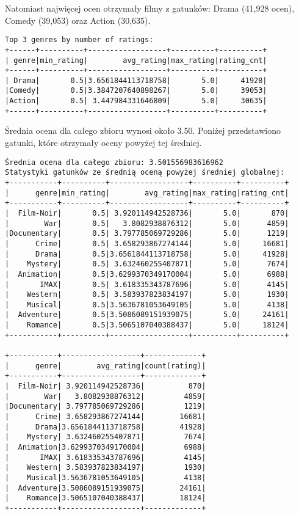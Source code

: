 \documentclass{article}
\begin{document}
Natomiast najwięcej ocen otrzymały filmy z gatunków: Drama (41,928 ocen), Comedy (39,053) oraz Action (30,635).

\begin{verbatim}
Top 3 genres by number of ratings:
+------+----------+------------------+----------+----------+
| genre|min_rating|        avg_rating|max_rating|rating_cnt|
+------+----------+------------------+----------+----------+
| Drama|       0.5|3.6561844113718758|       5.0|     41928|
|Comedy|       0.5|3.3847207640898267|       5.0|     39053|
|Action|       0.5| 3.447984331646809|       5.0|     30635|
+------+----------+------------------+----------+----------+
\end{verbatim}

Średnia ocena dla całego zbioru wynosi około 3.50. Poniżej przedstawiono gatunki, które otrzymały oceny powyżej tej średniej.

\begin{verbatim}
Średnia ocena dla całego zbioru: 3.501556983616962
Statystyki gatunków ze średnią oceną powyżej średniej globalnej:
+-----------+----------+------------------+----------+----------+
|      genre|min_rating|        avg_rating|max_rating|rating_cnt|
+-----------+----------+------------------+----------+----------+
|  Film-Noir|       0.5| 3.920114942528736|       5.0|       870|
|        War|       0.5|   3.8082938876312|       5.0|      4859|
|Documentary|       0.5| 3.797785069729286|       5.0|      1219|
|      Crime|       0.5| 3.658293867274144|       5.0|     16681|
|      Drama|       0.5|3.6561844113718758|       5.0|     41928|
|    Mystery|       0.5| 3.632460255407871|       5.0|      7674|
|  Animation|       0.5|3.6299370349170004|       5.0|      6988|
|       IMAX|       0.5| 3.618335343787696|       5.0|      4145|
|    Western|       0.5| 3.583937823834197|       5.0|      1930|
|    Musical|       0.5|3.5636781053649105|       5.0|      4138|
|  Adventure|       0.5|3.5086089151939075|       5.0|     24161|
|    Romance|       0.5|3.5065107040388437|       5.0|     18124|
+-----------+----------+------------------+----------+----------+

+-----------+------------------+-------------+
|      genre|        avg_rating|count(rating)|
+-----------+------------------+-------------+
|  Film-Noir| 3.920114942528736|          870|
|        War|   3.8082938876312|         4859|
|Documentary| 3.797785069729286|         1219|
|      Crime| 3.658293867274144|        16681|
|      Drama|3.6561844113718758|        41928|
|    Mystery| 3.632460255407871|         7674|
|  Animation|3.6299370349170004|         6988|
|       IMAX| 3.618335343787696|         4145|
|    Western| 3.583937823834197|         1930|
|    Musical|3.5636781053649105|         4138|
|  Adventure|3.5086089151939075|        24161|
|    Romance|3.5065107040388437|        18124|
+-----------+------------------+-------------+
\end{verbatim}
\end{document}
